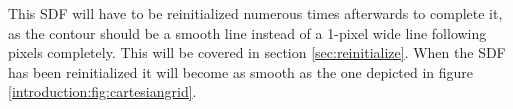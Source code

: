 This SDF will have to be reinitialized numerous times afterwards to
complete it, as the contour should be a smooth line instead of a
1-pixel wide line following pixels completely. This will be covered in
section \vref{sec:reinitialize}. When the SDF has been reinitialized
it will become as smooth as the one depicted in figure
\vref{introduction:fig:cartesiangrid}.



